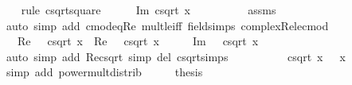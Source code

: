 \begin{isabellebody}
\ \ \isamarkupfalse%
\ {\isacharparenleft}{\kern0pt}rule\ csqrt{\isacharunderscore}{\kern0pt}square{\isacharparenright}{\kern0pt}\isanewline
\ \ \ \ \isamarkupfalse%
\ {\isachardoublequoteopen}Im\ {\isacharparenleft}{\kern0pt}csqrt\ x{\isacharparenright}{\kern0pt}\ {\isasymle}\ {}{\isachardoublequoteclose}\isanewline
\ \ \ \ \ \ \isamarkupfalse%
\ assms\ \isamarkupfalse%
\ {\isacharparenleft}{\kern0pt}auto\ simp\ add{\isacharcolon}{\kern0pt}\ cmod{\isacharunderscore}{\kern0pt}eq{\isacharunderscore}{\kern0pt}Re\ mult{\isacharunderscore}{\kern0pt}le{\isacharunderscore}{\kern0pt}{}{\isacharunderscore}{\kern0pt}iff\ field{\isacharunderscore}{\kern0pt}simps\ complex{\isacharunderscore}{\kern0pt}Re{\isacharunderscore}{\kern0pt}le{\isacharunderscore}{\kern0pt}cmod{\isacharparenright}{\kern0pt}\isanewline
\ \ \ \ \isamarkupfalse%
\ \isamarkupfalse%
\ {\isachardoublequoteopen}{}\ {\isacharless}{\kern0pt}\ Re\ {\isacharparenleft}{\kern0pt}{\isasymi}\ {\isacharasterisk}{\kern0pt}\ csqrt\ x{\isacharparenright}{\kern0pt}\ {\isasymor}\ Re\ {\isacharparenleft}{\kern0pt}{\isasymi}\ {\isacharasterisk}{\kern0pt}\ csqrt\ x{\isacharparenright}{\kern0pt}\ {\isacharequal}{\kern0pt}\ {}\ {\isasymand}\ {}\ {\isasymle}\ Im\ {\isacharparenleft}{\kern0pt}{\isasymi}\ {\isacharasterisk}{\kern0pt}\ csqrt\ x{\isacharparenright}{\kern0pt}{\isachardoublequoteclose}\isanewline
\ \ \ \ \ \ \isamarkupfalse%
\ {\isacharparenleft}{\kern0pt}auto\ simp\ add{\isacharcolon}{\kern0pt}\ Re{\isacharunderscore}{\kern0pt}csqrt\ simp\ del{\isacharcolon}{\kern0pt}\ csqrt{\isachardot}{\kern0pt}simps{\isacharparenright}{\kern0pt}\isanewline
\ \ \isamarkupfalse%
\isanewline
\ \ \isamarkupfalse%
\ \isamarkupfalse%
\ {\isachardoublequoteopen}{\isacharparenleft}{\kern0pt}{\isasymi}\ {\isacharasterisk}{\kern0pt}\ csqrt\ x{\isacharparenright}{\kern0pt}{\isacharcircum}{\kern0pt}{}\ {\isacharequal}{\kern0pt}\ {\isacharminus}{\kern0pt}\ x{\isachardoublequoteclose}\isanewline
\ \ \ \ \isamarkupfalse%
\ {\isacharparenleft}{\kern0pt}simp\ add{\isacharcolon}{\kern0pt}\ power{\isacharunderscore}{\kern0pt}mult{\isacharunderscore}{\kern0pt}distrib{\isacharparenright}{\kern0pt}\isanewline
\ \ \isamarkupfalse%
\ \isamarkupfalse%
\ {\isacharquery}{\kern0pt}thesis\ \isacommand{{\isachardot}{\kern0pt}}\isamarkupfalse%
\isanewline
{}\isamarkupfalse%

\end{isabellebody}
